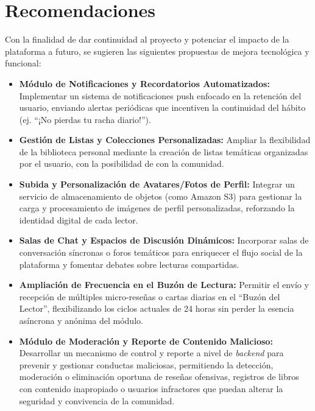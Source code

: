 \documentclass[12pt, atypical, journal]{article}
\begin{document}
\newpage

\section{Recomendaciones}
Con la finalidad de dar continuidad al proyecto y potenciar el impacto de la plataforma a futuro, se sugieren las siguientes propuestas de mejora tecnológica y funcional:

\begin{itemize}
	\item \textbf{Módulo de Notificaciones y Recordatorios Automatizados:} Implementar un sistema de notificaciones push enfocado en la retención del usuario, enviando alertas periódicas que incentiven la continuidad del hábito (ej. ``¡No pierdas tu racha diario!'').
	\item \textbf{Gestión de Listas y Colecciones Personalizadas:} Ampliar la flexibilidad de la biblioteca personal mediante la creación de listas temáticas organizadas por el usuario, con la posibilidad de con la comunidad.
	\item \textbf{Subida y Personalización de Avatares/Fotos de Perfil:} Integrar un servicio de almacenamiento de objetos (como Amazon S3) para gestionar la carga y procesamiento de imágenes de perfil personalizadas, reforzando la identidad digital de cada lector.
	\item \textbf{Salas de Chat y Espacios de Discusión Dinámicos:} Incorporar salas de conversación síncronas o foros temáticos para enriquecer el flujo social de la plataforma y fomentar debates sobre lecturas compartidas.
	\item \textbf{Ampliación de Frecuencia en el Buzón de Lectura:} Permitir el envío y recepción de múltiples micro-reseñas o cartas diarias en el ``Buzón del Lector'', flexibilizando los ciclos actuales de 24 horas sin perder la esencia asíncrona y anónima del módulo.
	\item \textbf{Módulo de Moderación y Reporte de Contenido Malicioso:} Desarrollar un mecanismo de control y reporte a nivel de \textit{backend} para prevenir y gestionar conductas maliciosas, permitiendo la detección, moderación o eliminación oportuna de reseñas ofensivas, registros de libros con contenido inapropiado o usuarios infractores que puedan alterar la seguridad y convivencia de la comunidad.
\end{itemize}
\end{document}
